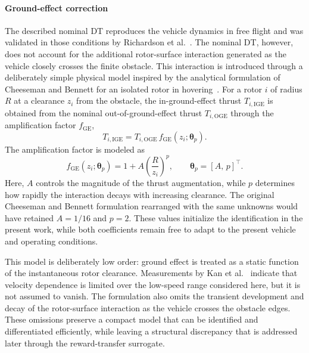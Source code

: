 \documentclass[journal]{IEEEtran}
\begin{document}
\paragraph*{Ground-effect correction}
\label{sec:ge-model}
The described nominal DT reproduces the vehicle dynamics in free flight and was validated in those conditions by Richardson et al.~\cite{Richardson2025}. The nominal DT, however,  does not account for the additional rotor-surface interaction generated as the vehicle closely crosses the finite obstacle. This interaction is introduced through a deliberately simple physical model inspired by the analytical formulation of Cheeseman and Bennett for an isolated rotor in hovering~\cite{CheesemanBennett1955}. For a rotor $i$ of radius $R$ at a clearance $z_i$ from the obstacle, the in-ground-effect thrust $T_{i,\mathrm{IGE}}$ is obtained from the nominal out-of-ground-effect thrust $T_{i,\mathrm{OGE}}$ through the amplification factor $f_{\mathrm{GE}}$,
\begin{equation}
 T_{i,\mathrm{IGE}}
 =T_{i,\mathrm{OGE}}\,
 f_{\mathrm{GE}}(z_i;\boldsymbol{\theta}_p).
 \label{eq:ge-thrust-factor}
\end{equation}
The amplification factor is modeled as
\begin{equation}
 f_{\mathrm{GE}}(z_i;\boldsymbol{\theta}_p)=1+A\left(\frac{R}{z_i}\right)^p,
 \qquad \boldsymbol{\theta}_p=[A,\,p]^\top .
 \label{eq:fge}
\end{equation}
Here, $A$ controls the magnitude of the thrust augmentation, while $p$ determines how rapidly the interaction decays with increasing clearance. The original Cheeseman and Bennett formulation rearranged with the same unknowns would have retained $A=1/16$ and $p=2$. These values initialize the identification in the present work, while both coefficients remain free to adapt to the present vehicle and operating conditions.

This model is deliberately low order: ground effect is treated as a static function of the instantaneous rotor clearance. Measurements by Kan et al.~\cite{Kan2019} indicate that velocity dependence is limited over the low-speed range considered here, but it is not assumed to vanish. The formulation also omits the transient development and decay of the rotor-surface interaction as the vehicle crosses the obstacle edges. These omissions preserve a compact model that can be identified and differentiated efficiently, while leaving a structural discrepancy that is addressed later through the reward-transfer surrogate.
\end{document}

